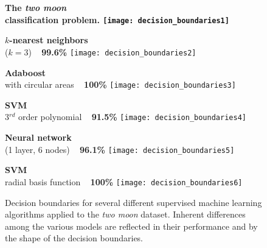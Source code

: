 \begin{figure}
	\begin{minipage}{0.33\textwidth}
		\centering
		\footnotesize \bf The \emph{two moon}\\classification problem.
		\texttt{[image: decision\_boundaries1]}
	\end{minipage}
	\begin{minipage}{0.33\textwidth}
		\centering
		\footnotesize {\bf $k$-nearest neighbors}\\($k=3$) ~ {\bf 99.6\%}
		\texttt{[image: decision\_boundaries2]}
	\end{minipage}
	\begin{minipage}{0.33\textwidth}
		\centering
		\footnotesize {\bf Adaboost}\\with circular areas ~ {\bf 100\%}
		\texttt{[image: decision\_boundaries3]}
	\end{minipage}
	\begin{minipage}{0.33\textwidth}
		\centering
		\vskip0.5cm
		\footnotesize {\bf SVM}\\3$^{rd}$ order polynomial ~ {\bf 91.5\%}
		\texttt{[image: decision\_boundaries4]}
	\end{minipage}
	\begin{minipage}{0.33\textwidth}
		\centering
		\vskip0.5cm
		\footnotesize {\bf Neural network}\\(1 layer, 6 nodes) ~ {\bf 96.1\%}
		\texttt{[image: decision\_boundaries5]}
	\end{minipage}
	\begin{minipage}{0.33\textwidth}
		\centering
		\vskip0.5cm
		\footnotesize {\bf SVM}\\radial basis function ~ {\bf 100\%}
		\texttt{[image: decision\_boundaries6]}
	\end{minipage}
	\caption[Decision boundaries for several different SML algorithms]{Decision boundaries for
	several different supervised machine learning algorithms applied to the \emph{two moon} dataset.
	Inherent differences among the various models are reflected in their performance and by the shape of the decision boundaries.}
	\label{fig:decision_boundaries}
\end{figure}


